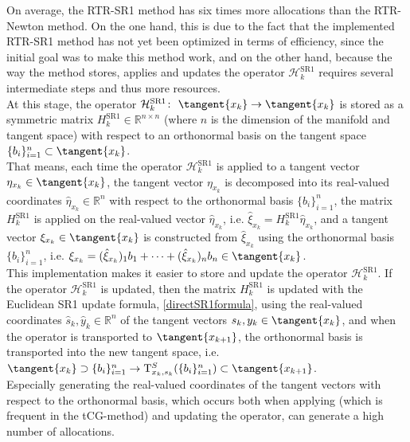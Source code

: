 On average, the RTR-SR1 method has six times more allocations than the RTR-Newton method. On the one hand, this is due to the fact that the implemented RTR-SR1 method has not yet been optimized in terms of efficiency, since the initial goal was to make this method work, and on the other hand, because the way the method stores, applies and updates the operator $\mathcal{H}^{\mathrm{SR1}}_k$ requires several intermediate steps and thus more resources. \\
At this stage, the operator $\mathcal{H}^{\mathrm{SR1}}_k \colon \ \tangent{x_k} \to \tangent{x_k}$ is stored as a symmetric matrix $H^{\mathrm{SR1}}_k \in \mathbb{R}^{n \times n}$ (where $n$ is the dimension of the manifold and tangent space) with respect to an orthonormal basis on the tangent space $\{ b_i \}^{n}_{i=1} \subset \tangent{x_k}$. \\
That means, each time the operator $\mathcal{H}^{\mathrm{SR1}}_k$ is applied to a tangent vector $\eta_{x_k} \in \tangent{x_k}$, the tangent vector $\eta_{x_k}$ is decomposed into its real-valued coordinates $\hat{\eta}_{x_k} \in \mathbb{R}^n$ with respect to the orthonormal basis $\{ b_i \}^{n}_{i=1}$, the matrix $H^{\mathrm{SR1}}_k$ is applied on the real-valued vector $\hat{\eta}_{x_k}$, i.e. $\hat{\xi}_{x_k} = H^{\mathrm{SR1}}_k \hat{\eta}_{x_k}$, and a tangent vector $\xi_{x_k} \in \tangent{x_k}$ is constructed from $\hat{\xi}_{x_k}$ using the orthonormal basis $\{ b_i \}^{n}_{i=1}$, i.e. $\xi_{x_k} = (\hat{\xi}_{x_k})_{1} b_1 + \cdots + (\hat{\xi}_{x_k})_{n} b_n \in \tangent{x_k}$. \\
This implementation makes it easier to store and update the operator $\mathcal{H}^{\mathrm{SR1}}_k$. If the operator $\mathcal{H}^{\mathrm{SR1}}_k$ is updated, then the matrix $H^{\mathrm{SR1}}_k$ is updated with the Euclidean SR1 update formula, \cref{directSR1formula}, using the real-valued coordinates $\hat{s}_k, \hat{y}_k \in \mathbb{R}^n$ of the tangent vectors $s_k, y_k \in \tangent{x_k}$, and when the operator is transported to $\tangent{x_{k+1}}$, the orthonormal basis is transported into the new tangent space, i.e. $\tangent{x_k} \supset \{ b_i \}^{n}_{i=1} \rightarrow \mathrm{T}^{S}_{x_k, s_k}(\{ b_i \}^{n}_{i=1}) \subset \tangent{x_{k+1}}$. \\ 
Especially generating the real-valued coordinates of the tangent vectors with respect to the orthonormal basis, which occurs both when applying (which is frequent in the tCG-method) and updating the operator, can generate a high number of allocations. \\
